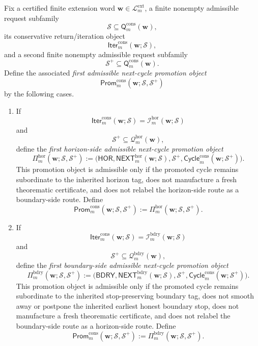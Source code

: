 \begin{definition}
\label{def:first-admissible-next-cycle-promotion-rule}
Fix a certified finite extension word \(\mathbf w\in\mathcal L^{\mathrm{ext}}_{m}\), a finite nonempty admissible request subfamily
\[
 \mathcal S \subseteq \mathsf{Q}^{\mathrm{cons}}_{m}(\mathbf w),
\]
its conservative return/iteration object
\[
 \mathsf{Iter}^{\mathrm{cons}}_{m}(\mathbf w;\mathcal S),
\]
and a second finite nonempty admissible request subfamily
\[
 \mathcal S^{+}\subseteq \mathsf{Q}^{\mathrm{cons}}_{m}(\mathbf w).
\]
Define the associated \emph{first admissible next-cycle promotion object}
\[
 \mathsf{Prom}^{\mathrm{cons}}_{m}(\mathbf w;\mathcal S,\mathcal S^{+})
\]
by the following cases.
\begin{enumerate}[label=(\roman*)]
 \item If
 \[
 \mathsf{Iter}^{\mathrm{cons}}_{m}(\mathbf w;\mathcal S)
 =
 \mathcal I^{\mathrm{hor}}_{m}(\mathbf w;\mathcal S)
 \]
and
\[
 \mathcal S^{+}\subseteq \mathcal Q^{\mathrm{hor}}_{m}(\mathbf w),
\]
define the \emph{first horizon-side admissible next-cycle promotion object}
\[
 \Pi^{\mathrm{hor}}_{m}(\mathbf w;\mathcal S,\mathcal S^{+})
 :=
 \bigl(
 \mathsf{HOR},
 \mathsf{NEXT}^{\mathrm{hor}}_{m}(\mathbf w;\mathcal S),
 \mathcal S^{+},
 \mathsf{Cycle}^{\mathrm{cons}}_{m}(\mathbf w;\mathcal S^{+})
 \bigr).
\]
This promotion object is admissible only if the promoted cycle remains subordinate to the inherited horizon tag, does not manufacture a fresh theorematic certificate, and does not relabel the horizon-side route as a boundary-side route. Define
\[
 \mathsf{Prom}^{\mathrm{cons}}_{m}(\mathbf w;\mathcal S,\mathcal S^{+})
 :=
 \Pi^{\mathrm{hor}}_{m}(\mathbf w;\mathcal S,\mathcal S^{+}).
\]

 \item If
 \[
 \mathsf{Iter}^{\mathrm{cons}}_{m}(\mathbf w;\mathcal S)
 =
 \mathcal I^{\mathrm{bdry}}_{m}(\mathbf w;\mathcal S)
 \]
and
\[
 \mathcal S^{+}\subseteq \mathcal Q^{\mathrm{bdry}}_{m}(\mathbf w),
\]
define the \emph{first boundary-side admissible next-cycle promotion object}
\[
 \Pi^{\mathrm{bdry}}_{m}(\mathbf w;\mathcal S,\mathcal S^{+})
 :=
 \bigl(
 \mathsf{BDRY},
 \mathsf{NEXT}^{\mathrm{bdry}}_{m}(\mathbf w;\mathcal S),
 \mathcal S^{+},
 \mathsf{Cycle}^{\mathrm{cons}}_{m}(\mathbf w;\mathcal S^{+})
 \bigr).
\]
This promotion object is admissible only if the promoted cycle remains subordinate to the inherited stop-preserving boundary tag, does not smooth away or postpone the inherited earliest honest boundary stop, does not manufacture a fresh theorematic certificate, and does not relabel the boundary-side route as a horizon-side route. Define
\[
 \mathsf{Prom}^{\mathrm{cons}}_{m}(\mathbf w;\mathcal S,\mathcal S^{+})
 :=
 \Pi^{\mathrm{bdry}}_{m}(\mathbf w;\mathcal S,\mathcal S^{+}).
\]
\end{enumerate}
\end{definition}

